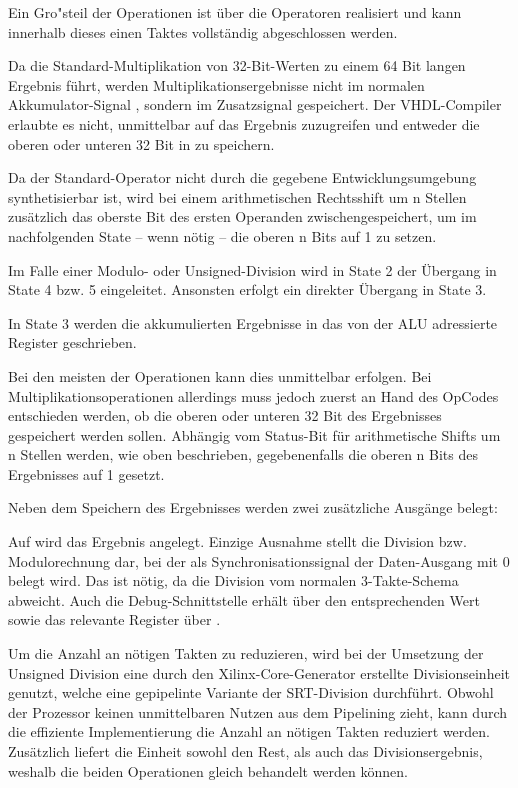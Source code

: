 Ein Gro"steil der Operationen ist \"uber die  Operatoren realisiert und kann innerhalb dieses einen Taktes vollst\"andig abgeschlossen werden.

Da die Standard-Multiplikation von 32-Bit-Werten zu einem 64 Bit langen Ergebnis f\"uhrt, werden Multiplikationsergebnisse nicht im normalen Akkumulator-Signal , sondern im Zusatzsignal  gespeichert. Der VHDL-Compiler erlaubte es nicht, unmittelbar auf das Ergebnis zuzugreifen und entweder die oberen oder unteren 32 Bit in  zu speichern.\vspace{10pt}

Da der Standard-Operator  nicht durch die gegebene Entwicklungsumgebung synthetisierbar ist, wird bei einem arithmetischen Rechtsshift um {n} Stellen zus\"atzlich das oberste Bit des ersten Operanden zwischengespeichert, um im nachfolgenden State – wenn n\"otig – die oberen {n} Bits auf {1} zu setzen.\vspace{10pt}

Im Falle einer Modulo- oder Unsigned-Division wird in State 2 der \"Ubergang in State 4 bzw. 5 eingeleitet. Ansonsten erfolgt ein direkter \"Ubergang in State 3.

In State 3 werden die akkumulierten Ergebnisse in das von der ALU adressierte Register geschrieben.

Bei den meisten der Operationen kann dies unmittelbar erfolgen. Bei Multiplikationsoperationen allerdings muss jedoch zuerst an Hand des OpCodes entschieden werden, ob die oberen oder unteren 32 Bit des Ergebnisses gespeichert werden sollen. Abh\"angig vom Status-Bit f\"ur arithmetische Shifts um {n} Stellen werden, wie oben beschrieben, gegebenenfalls die oberen n Bits des Ergebnisses auf {1} gesetzt.\vspace{10pt}


Neben dem Speichern des Ergebnisses werden zwei zus\"atzliche Ausg\"ange belegt:

Auf  wird das Ergebnis angelegt. Einzige Ausnahme stellt die Division bzw. Modulorechnung dar, bei der als Synchronisationssignal der Daten-Ausgang mit 0 belegt wird. Das ist n\"otig, da die Division vom normalen 3-Takte-Schema abweicht.
Auch die Debug-Schnittstelle erh\"alt \"uber  den entsprechenden Wert sowie das relevante Register \"uber .

Um die Anzahl an n\"otigen Takten zu reduzieren, wird bei der Umsetzung der Unsigned Division eine durch den Xilinx-Core-Generator erstellte Divisionseinheit genutzt, welche eine gepipelinte Variante der SRT-Division durchf\"uhrt. Obwohl der Prozessor keinen unmittelbaren Nutzen aus dem Pipelining zieht, kann durch die effiziente Implementierung die Anzahl an n\"otigen Takten reduziert werden. Zus\"atzlich liefert die Einheit sowohl den Rest, als auch das Divisionsergebnis, weshalb die beiden Operationen gleich behandelt werden k\"onnen.



